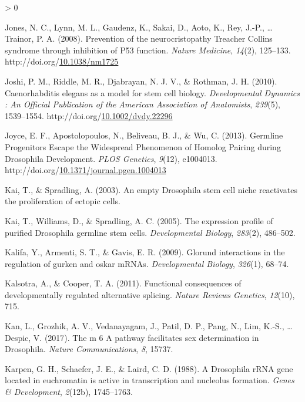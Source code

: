 \documentclass[12pt,oneside]{reedthesis}
\newlength{\cslhangindent}
\newenvironment{CSLReferences}[2] %
 {%
  \setlength{\parindent}{0pt}
  \ifodd #1 \everypar{\setlength{\hangindent}{\cslhangindent}}\ignorespaces\fi
  \ifnum #2 > 0
  \setlength{\parskip}{#2\baselineskip}
  \fi
 }%
 {}
\begin{document}
\begin{CSLReferences}{1}{0}
\leavevmode\hypertarget{ref-jonesPreventionNeurocristopathyTreacher2008}{}%
Jones, N. C., Lynn, M. L., Gaudenz, K., Sakai, D., Aoto, K., Rey, J.-P., \ldots{} Trainor, P. A. (2008). Prevention of the neurocristopathy {Treacher Collins} syndrome through inhibition of P53 function. \emph{Nature Medicine}, \emph{14}(2), 125--133. http://doi.org/\href{https://doi.org/10.1038/nm1725}{10.1038/nm1725}

\leavevmode\hypertarget{ref-Joshi2010l}{}%
Joshi, P. M., Riddle, M. R., Djabrayan, N. J. V., \& Rothman, J. H. (2010). Caenorhabditis elegans as a model for stem cell biology. \emph{Developmental Dynamics : An Official Publication of the American Association of Anatomists}, \emph{239}(5), 1539--1554. http://doi.org/\href{https://doi.org/10.1002/dvdy.22296}{10.1002/dvdy.22296}

\leavevmode\hypertarget{ref-joyceGermlineProgenitorsEscape2013}{}%
Joyce, E. F., Apostolopoulos, N., Beliveau, B. J., \& Wu, C. (2013). Germline {Progenitors Escape} the {Widespread Phenomenon} of {Homolog Pairing} during {Drosophila Development}. \emph{PLOS Genetics}, \emph{9}(12), e1004013. http://doi.org/\href{https://doi.org/10.1371/journal.pgen.1004013}{10.1371/journal.pgen.1004013}

\leavevmode\hypertarget{ref-kaiEmptyDrosophilaStem2003}{}%
Kai, T., \& Spradling, A. (2003). An empty {Drosophila} stem cell niche reactivates the proliferation of ectopic cells.

\leavevmode\hypertarget{ref-Kai2005}{}%
Kai, T., Williams, D., \& Spradling, A. C. (2005). The expression profile of purified {Drosophila} germline stem cells. \emph{Developmental Biology}, \emph{283}(2), 486--502.

\leavevmode\hypertarget{ref-Kalifa2009}{}%
Kalifa, Y., Armenti, S. T., \& Gavis, E. R. (2009). Glorund interactions in the regulation of gurken and oskar {mRNAs}. \emph{Developmental Biology}, \emph{326}(1), 68--74.

\leavevmode\hypertarget{ref-Kalsotra2011}{}%
Kalsotra, A., \& Cooper, T. A. (2011). Functional consequences of developmentally regulated alternative splicing. \emph{Nature Reviews Genetics}, \emph{12}(10), 715.

\leavevmode\hypertarget{ref-Kan2017}{}%
Kan, L., Grozhik, A. V., Vedanayagam, J., Patil, D. P., Pang, N., Lim, K.-S., \ldots{} Despic, V. (2017). The m 6 {A} pathway facilitates sex determination in {Drosophila}. \emph{Nature Communications}, \emph{8}, 15737.

\leavevmode\hypertarget{ref-Karpen1988a}{}%
Karpen, G. H., Schaefer, J. E., \& Laird, C. D. (1988). A {Drosophila rRNA} gene located in euchromatin is active in transcription and nucleolus formation. \emph{Genes \& Development}, \emph{2}(12b), 1745--1763.


\end{CSLReferences}
\end{document}

